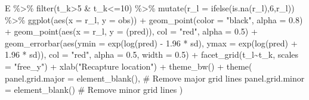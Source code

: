 \documentclass[
  letterpaper,
  DIV=11,
  numbers=noendperiod]{scrartcl}
\newenvironment{Shaded}{\begin{snugshade}}{\end{snugshade}}
\newcommand{\AttributeTok}[1]{\textcolor[rgb]{0.40,0.45,0.13}{#1}}
\newcommand{\CommentTok}[1]{\textcolor[rgb]{0.37,0.37,0.37}{#1}}
\newcommand{\DecValTok}[1]{\textcolor[rgb]{0.68,0.00,0.00}{#1}}
\newcommand{\FloatTok}[1]{\textcolor[rgb]{0.68,0.00,0.00}{#1}}
\newcommand{\FunctionTok}[1]{\textcolor[rgb]{0.28,0.35,0.67}{#1}}
\newcommand{\NormalTok}[1]{\textcolor[rgb]{0.00,0.23,0.31}{#1}}
\newcommand{\SpecialCharTok}[1]{\textcolor[rgb]{0.37,0.37,0.37}{#1}}
\newcommand{\StringTok}[1]{\textcolor[rgb]{0.13,0.47,0.30}{#1}}
\begin{document}
\begin{Shaded}
\begin{Highlighting}[]
\NormalTok{E }\SpecialCharTok{\%\textgreater{}\%}
  \FunctionTok{filter}\NormalTok{(t\_k}\SpecialCharTok{\textgreater{}}\DecValTok{5} \SpecialCharTok{\&}\NormalTok{ t\_k}\SpecialCharTok{\textless{}=}\DecValTok{10}\NormalTok{) }\SpecialCharTok{\%\textgreater{}\%}
  \FunctionTok{mutate}\NormalTok{(}\AttributeTok{r\_l =} \FunctionTok{ifelse}\NormalTok{(}\FunctionTok{is.na}\NormalTok{(r\_l),}\DecValTok{6}\NormalTok{,r\_l)) }\SpecialCharTok{\%\textgreater{}\%}
  \FunctionTok{ggplot}\NormalTok{(}\FunctionTok{aes}\NormalTok{(}\AttributeTok{x =}\NormalTok{ r\_l, }\AttributeTok{y =}\NormalTok{ obs)) }\SpecialCharTok{+}
  \FunctionTok{geom\_point}\NormalTok{(}\AttributeTok{color =} \StringTok{"black"}\NormalTok{, }\AttributeTok{alpha =} \FloatTok{0.8}\NormalTok{) }\SpecialCharTok{+}
  \FunctionTok{geom\_point}\NormalTok{(}\FunctionTok{aes}\NormalTok{(}\AttributeTok{x =}\NormalTok{ r\_l, }\AttributeTok{y =}\NormalTok{ (pred)), }\AttributeTok{col =} \StringTok{"red"}\NormalTok{, }\AttributeTok{alpha =} \FloatTok{0.5}\NormalTok{) }\SpecialCharTok{+}
  \FunctionTok{geom\_errorbar}\NormalTok{(}\FunctionTok{aes}\NormalTok{(}\AttributeTok{ymin =} \FunctionTok{exp}\NormalTok{(}\FunctionTok{log}\NormalTok{(pred) }\SpecialCharTok{{-}} \FloatTok{1.96} \SpecialCharTok{*}\NormalTok{ sd), }\AttributeTok{ymax =} \FunctionTok{exp}\NormalTok{(}\FunctionTok{log}\NormalTok{(pred) }\SpecialCharTok{+} \FloatTok{1.96} \SpecialCharTok{*}\NormalTok{ sd)), }\AttributeTok{col =} \StringTok{"red"}\NormalTok{, }\AttributeTok{alpha =} \FloatTok{0.5}\NormalTok{, }\AttributeTok{width =} \FloatTok{0.5}\NormalTok{) }\SpecialCharTok{+}
\FunctionTok{facet\_grid}\NormalTok{(t\_l}\SpecialCharTok{\textasciitilde{}}\NormalTok{t\_k, }\AttributeTok{scales =} \StringTok{"free\_y"}\NormalTok{) }\SpecialCharTok{+}
    \FunctionTok{xlab}\NormalTok{(}\StringTok{"Recapture location"}\NormalTok{) }\SpecialCharTok{+}
  \FunctionTok{theme\_bw}\NormalTok{() }\SpecialCharTok{+}
  \FunctionTok{theme}\NormalTok{(}
    \AttributeTok{panel.grid.major =} \FunctionTok{element\_blank}\NormalTok{(),  }\CommentTok{\# Remove major grid lines}
    \AttributeTok{panel.grid.minor =} \FunctionTok{element\_blank}\NormalTok{()   }\CommentTok{\# Remove minor grid lines}
\NormalTok{  )}
\end{Highlighting}
\end{Shaded}
\end{document}
